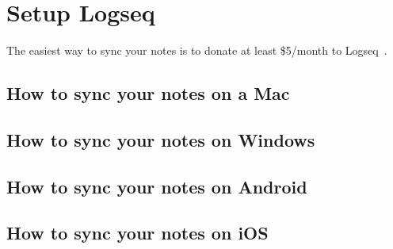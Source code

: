 \chapter{Setup Logseq}\label{ch:setup-logseq}

The easiest way to sync your notes is to donate at least \$5/month to Logseq~\cite{logseqHowSetupUse}.
%


\section{How to sync your notes on a Mac}\label{subsec:how-to-sync-your-notes-on-a-mac}


\section{How to sync your notes on Windows}\label{subsec:how-to-sync-your-notes-on-windows}


\section{How to sync your notes on Android}\label{subsec:how-to-sync-your-notes-on-android}


\section{How to sync your notes on iOS}\label{subsec:how-to-sync-your-notes-on-ios}
